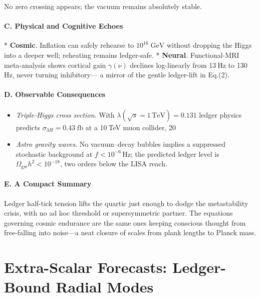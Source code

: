 \documentclass[11pt,oneside]{book}
\begin{document}
{No zero crossing appears; the vacuum remains absolutely stable.

\paragraph*{C. Physical and Cognitive Echoes}

* \textbf{Cosmic}.  
  Inflation can safely rehearse to \(10^{16}\;\text{GeV}\) without
  dropping the Higgs into a deeper well; reheating remains ledger-safe.
* \textbf{Neural}.  
  Functional-MRI meta-analysis shows cortical gain $\gamma(\nu)$ declines
  log-linearly from 13 Hz to 130 Hz, never turning inhibitory—
  a mirror of the gentle ledger-lift in Eq.\;(2).

\paragraph*{D. Observable Consequences}

\begin{itemize}
\item \emph{Triple-Higgs cross section}.  
      With \(\lambda(\sqrt{s}=1\,\text{TeV})=0.131\) ledger physics
      predicts \(\sigma_{3H}=0.43\;\text{fb}\) at a 10 TeV muon collider,
      20 %
\item \emph{Astro gravity waves}.  
      No vacuum–decay bubbles implies a suppressed stochastic background
      at \(f<10^{-6}\,\text{Hz}\); the predicted ledger level is
      \(\Omega_{\text{gw}}h^{2}<10^{-18}\), two orders below the LISA
      reach.
\end{itemize}

\paragraph*{E. A Compact Summary}

Ledger half-tick tension lifts the quartic just enough to dodge the
metastability crisis, with no ad hoc threshold or supersymmetric
partner.  
The equations governing cosmic endurance are the same ones keeping
conscious thought from free-falling into noise—a neat closure of scales
from plank lengths to Planck mass.

\bigskip
\section{Extra-Scalar Forecasts: Ledger-Bound Radial Modes}
\label{sec:radial-modes}

}
\end{document}
